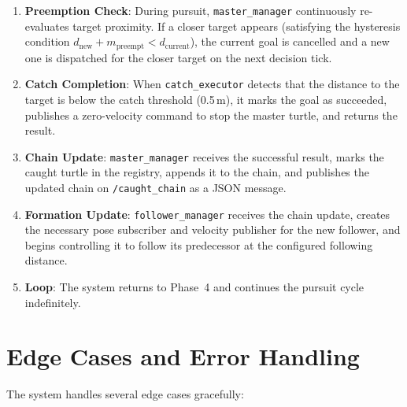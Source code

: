 \begin{enumerate}[label=\textbf{Phase \arabic*:}]
  \item \textbf{Preemption Check}: During pursuit, \texttt{master\_manager} continuously re-evaluates target proximity. If a closer target appears (satisfying the hysteresis condition $d_{\text{new}} + m_{\text{preempt}} < d_{\text{current}}$), the current goal is cancelled and a new one is dispatched for the closer target on the next decision tick.

  \item \textbf{Catch Completion}: When \texttt{catch\_executor} detects that the distance to the target is below the catch threshold (0.5\,m), it marks the goal as succeeded, publishes a zero-velocity command to stop the master turtle, and returns the result.

  \item \textbf{Chain Update}: \texttt{master\_manager} receives the successful result, marks the caught turtle in the registry, appends it to the chain, and publishes the updated chain on \texttt{/caught\_chain} as a JSON message.

  \item \textbf{Formation Update}: \texttt{follower\_manager} receives the chain update, creates the necessary pose subscriber and velocity publisher for the new follower, and begins controlling it to follow its predecessor at the configured following distance.

  \item \textbf{Loop}: The system returns to Phase~4 and continues the pursuit cycle indefinitely.
\end{enumerate}

\section{Edge Cases and Error Handling}

The system handles several edge cases gracefully:

